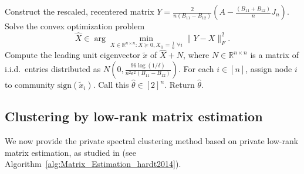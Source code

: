 \documentclass{article}
\newcommand{\real}{\mathbb{R}}
\begin{document}
\begin{algorithm}[h!]
\caption{Two-community Private Weak Recovery for SBM}
\label{alg:TC_Optimiz}
\begin{algorithmic}[1]
\State Construct the rescaled, recentered matrix $Y = \frac{2}{n(B_{11} - B_{12})} \left(A - \frac{(B_{11} + B_{12})}{n} J_n\right)$.
\State Solve the convex optimization problem
\begin{equation*}
\widehat{X} \in \arg\min_{X \in \real^{n \times n}: X \succeq 0, X_{ii} = \frac{1}{n} \; \forall i} \|Y-X\|_F^2.
\end{equation*}
\State Compute the leading unit eigenvector $\widetilde{x}$ of $\widehat{X} + N$, where $N \in \real^{n \times n}$ is a matrix of i.i.d.\ entries distributed as $N\left(0, \frac{96\log(1/\delta)}{n^2\epsilon^2(B_{11} - B_{12})}\right)$.
\State For each $i \in [n]$, assign node $i$ to community $\text{sign}(\widetilde{x}_i)$. Call this $\hat{\theta} \in [2]^n$.
\State Return $\hat{\theta}$.
\EndFunction
\end{algorithmic}
\end{algorithm}


\subsection{Clustering by low-rank matrix estimation}
\label{AppSCLR}

We now provide the private spectral clustering method based on private low-rank matrix estimation, as studied in \cite{hardt2014noisy, d2025tight} (see Algorithm~\ref{alg:Matrix_Estimation_hardt2014}).
\end{document}
